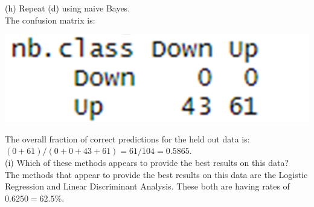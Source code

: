 \documentclass{article}
\begin{document}
\linebreak (h) Repeat (d) using naive Bayes. \\
The confusion matrix is: 
\begin{center}
\includegraphics[scale = 0.46]{2.13.h.png} \\
\end{center}
The overall fraction of correct predictions for the held out data is: $(0 + 61)/(0 + 0 + 43 + 61) = 61/104 = 0.5865$. \\
\linebreak (i) Which of these methods appears to provide the best results on
this data? \\
\indent The methods that appear to provide the best results on this data are the Logistic Regression and Linear Discriminant Analysis. These both are having rates of $0.6250 = 62.5\%$.
\end{document}
